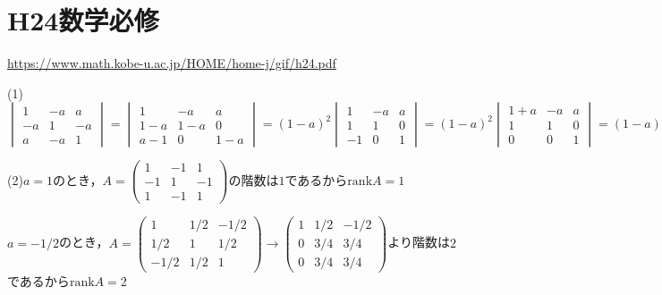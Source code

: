 \documentclass[
		book,
		head_space=20mm,
		foot_space=20mm,
		gutter=10mm,
		line_length=190mm
]{jlreq}
\begin{document}
\section{H24数学必修}
\url{https://www.math.kobe-u.ac.jp/HOME/home-j/gif/h24.pdf}

(1)$\begin{vmatrix}
    1 & -a & a \\
    -a & 1 & -a \\
    a & -a & 1
\end{vmatrix}=\begin{vmatrix}
    1 & -a & a \\
    1-a & 1-a & 0 \\
    a-1 & 0 & 1-a
\end{vmatrix}=(1-a)^2\begin{vmatrix}
    1 & -a & a \\
    1 & 1 & 0 \\
    -1 & 0 & 1
    \end{vmatrix}=(1-a)^2\begin{vmatrix}
    1+a & -a & a \\
    1 & 1 & 0 \\
    0 & 0 & 1
    \end{vmatrix}=(1-a)^2\begin{vmatrix}
    1+a & -a \\
    1 & 1
    \end{vmatrix}=(1-a)^2(1+a+a)=(a-1)^2(2a+1)$

    (2)$a=1$のとき，$A=\begin{pmatrix}
        1 & -1 & 1 \\
        -1 & 1 & -1 \\
        1 & -1 & 1
    \end{pmatrix}$の階数は$1$であるから$\mathrm{rank} A=1$

    $a=-1/2$のとき，$A=\begin{pmatrix}
        1 & 1/2 & -1/2 \\
        1/2 & 1 & 1/2 \\
        -1/2 & 1/2 & 1
        \end{pmatrix}\rightarrow \begin{pmatrix}
        1 & 1/2 & -1/2 \\
        0 & 3/4 & 3/4 \\
        0 & 3/4 & 3/4
        \end{pmatrix}$より階数は$2$であるから$\mathrm{rank} A=2$
\end{document}
